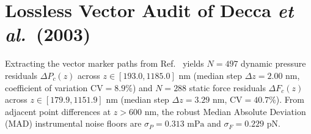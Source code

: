 \documentclass[10pt,twocolumn,a4paper]{article}
\begin{document}
\begin{table}[t]
\centering
\caption{Spectral audit of the lossless vector-extracted residuals of Decca \textit{et al.}\ (2003) across detrending regimes. Instrumental noise floors calibrated from first differences at $z > 600\text{ nm}$ are $\sigma_P = 0.313\text{ mPa}$ (Fig.~4b) and $\sigma_F = 0.229\text{ pN}$ (Fig.~3b).}
\label{tab:decca_audit}
\end{table}

\section{Lossless Vector Audit of Decca \textit{et al.}\ (2003)}
Extracting the vector marker paths from Ref.~\cite{decca2003} yields $N = 497$ dynamic pressure residuals $\Delta P_c(z)$ across $z \in [193.0, 1185.0]\text{ nm}$ (median step $\Delta z = 2.00\text{ nm}$, coefficient of variation $\mathrm{CV} = 8.9\%$) and $N = 288$ static force residuals $\Delta F_c(z)$ across $z \in [179.9, 1151.9]\text{ nm}$ (median step $\Delta z = 3.29\text{ nm}$, $\mathrm{CV} = 40.7\%$). From adjacent point differences at $z > 600\text{ nm}$, the robust Median Absolute Deviation (MAD) instrumental noise floors are $\sigma_P = 0.313\text{ mPa}$ and $\sigma_F = 0.229\text{ pN}$.
\end{document}
